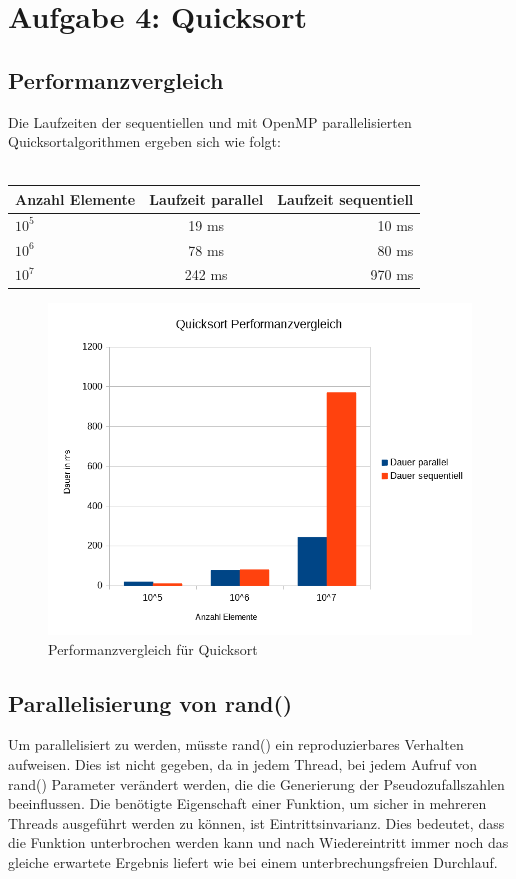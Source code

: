 \chapter{Aufgabe 4: Quicksort}
\section{Performanzvergleich}
Die Laufzeiten der sequentiellen und mit OpenMP parallelisierten Quicksortalgorithmen ergeben sich wie folgt:\\ \\

\begin{center}
\begin{tabular}{l|c|r}
Anzahl Elemente & Laufzeit parallel & Laufzeit sequentiell \\
\hline
$10^5$ & 19 ms & 10 ms \\
$10^6$ & 78 ms & 80 ms \\
$10^7$ & 242 ms & 970 ms \\
\end{tabular}
\end{center}

\begin{figure}[H]
    \centering
    \includegraphics[width = \textwidth]{img/qs_performance_comparison.png}
    \caption{Performanzvergleich für Quicksort}
    \label{qs_perf_comp}
\end{figure}

\section{Parallelisierung von rand()}
Um parallelisiert zu werden, müsste rand() ein reproduzierbares Verhalten aufweisen. Dies ist nicht gegeben, da in jedem Thread, bei jedem Aufruf von rand() Parameter verändert werden, die die Generierung der Pseudozufallszahlen beeinflussen. Die benötigte Eigenschaft einer Funktion, um sicher in mehreren Threads ausgeführt werden zu können, ist Eintrittsinvarianz. Dies bedeutet, dass die Funktion unterbrochen werden kann und nach Wiedereintritt immer noch das gleiche erwartete Ergebnis liefert wie bei einem unterbrechungsfreien Durchlauf.
